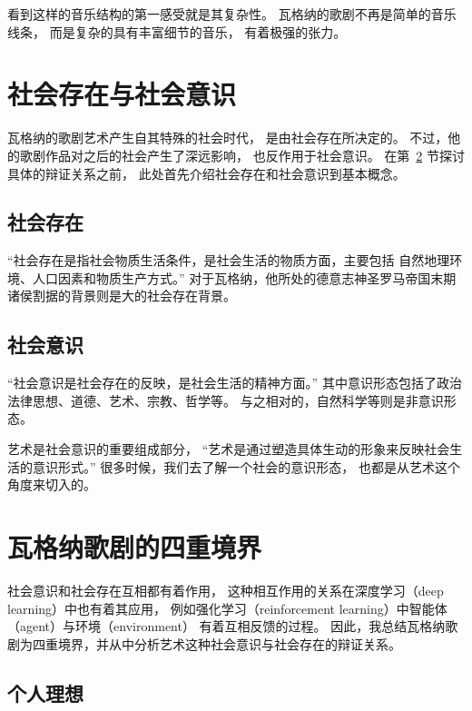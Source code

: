 \documentclass[10pt,a4paper,twocolumn]{article}
\begin{document}
    看到这样的音乐结构的第一感受就是其复杂性。
    瓦格纳的歌剧不再是简单的音乐线条，
    而是复杂的具有丰富细节的音乐，
    有着极强的张力。

  \section{社会存在与社会意识}

    瓦格纳的歌剧艺术产生自其特殊的社会时代，
    是由社会存在所决定的。
    不过，他的歌剧作品对之后的社会产生了深远影响，
    也反作用于社会意识。
    在第~\ref{sec:details} 节探讨具体的辩证关系之前，
    此处首先介绍社会存在和社会意识到基本概念。

    \subsection{社会存在}

      ``社会存在是指社会物质生活条件，是社会生活的物质方面，主要包括
      自然地理环境、人口因素和物质生产方式。''\cite{book}
      对于瓦格纳，他所处的德意志神圣罗马帝国末期诸侯割据的背景则是大的社会存在背景。

    \subsection{社会意识}

      ``社会意识是社会存在的反映，是社会生活的精神方面。''\cite{book}
      其中意识形态包括了政治法律思想、道德、艺术、宗教、哲学等。
      与之相对的，自然科学等则是非意识形态。

      艺术是社会意识的重要组成部分，
      ``艺术是通过塑造具体生动的形象来反映社会生活的意识形式。''\cite{book}
      很多时候，我们去了解一个社会的意识形态，
      也都是从艺术这个角度来切入的。

  \section{瓦格纳歌剧的四重境界}\label{sec:details}

    社会意识和社会存在互相都有着作用，
    这种相互作用的关系在深度学习（deep learning）中也有着其应用，
    例如强化学习（reinforcement learning）中智能体（agent）与环境（environment）
    有着互相反馈的过程。
    因此，我总结瓦格纳歌剧为四重境界，并从中分析艺术这种社会意识与社会存在的辩证关系。

    \subsection{个人理想}
\end{document}
